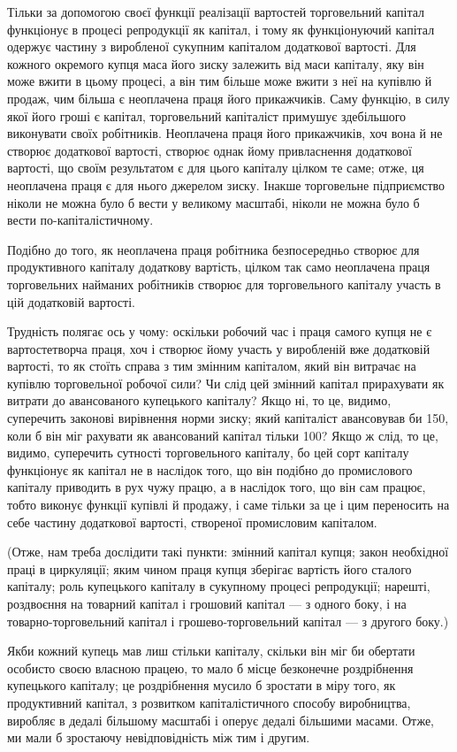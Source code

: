 Тільки за допомогою своєї функції реалізації вартостей торговельний
капітал функціонує в процесі репродукції як капітал,
і тому як функціонуючий капітал одержує частину з виробленої
сукупним капіталом додаткової вартості. Для кожного окремого
купця маса його зиску залежить від маси капіталу, яку він
може вжити в цьому процесі, а він тим більше може вжити
з неї на купівлю й продаж, чим більша є неоплачена праця його
прикажчиків. Саму функцію, в силу якої його гроші є капітал,
торговельний капіталіст примушує здебільшого виконувати своїх
робітників. Неоплачена праця його прикажчиків, хоч вона й не
створює додаткової вартості, створює однак йому привласнення
додаткової вартості, що своїм результатом є для цього капіталу
цілком те саме; отже, ця неоплачена праця є для нього
джерелом зиску. Інакше торговельне підприємство ніколи не
можна було б вести у великому масштабі, ніколи не можна
було б вести по-капіталістичному.

Подібно до того, як неоплачена праця робітника безпосередньо
створює для продуктивного капіталу додаткову вартість, цілком
так само неоплачена праця торговельних найманих робітників створює
для торговельного капіталу участь в цій додатковій вартості.

Трудність полягає ось у чому: оскільки робочий час і праця
самого купця не є вартостетворча праця, хоч і створює йому
участь у виробленій вже додатковій вартості, то як стоїть справа
з тим змінним капіталом, який він витрачає на купівлю торговельної
робочої сили? Чи слід цей змінний капітал прирахувати
як витрати до авансованого купецького капіталу? Якщо ні, то це,
видимо, суперечить законові вирівнення норми зиску; який капіталіст
авансовував би 150, коли б він міг рахувати як авансований
капітал тільки 100? Якщо ж слід, то це, видимо, суперечить
сутності торговельного капіталу, бо цей сорт капіталу
функціонує як капітал не в наслідок того, що він подібно до
промислового капіталу приводить в рух чужу працю, а в наслідок
того, що він сам працює, тобто виконує функції купівлі й продажу,
і саме тільки за це і цим переносить на себе частину
додаткової вартості, створеної промисловим капіталом.

(Отже, нам треба дослідити такі пункти: змінний капітал купця;
закон необхідної праці в циркуляції; яким чином праця купця
зберігає вартість його сталого капіталу; роль купецького капіталу
в сукупному процесі репродукції; нарешті, роздвоєння на
товарний капітал і грошовий капітал — з одного боку, і на товарно-торговельний
капітал і грошево-торговельний капітал —
з другого боку.)

Якби кожний купець мав лиш стільки капіталу, скільки він
міг би обертати особисто своєю власною працею, то мало б
місце безконечне роздрібнення купецького капіталу; це роздрібнення
мусило б зростати в міру того, як продуктивний капітал,
з розвитком капіталістичного способу виробництва, виробляє
в дедалі більшому масштабі і оперує дедалі більшими масами.
Отже, ми мали б зростаючу невідповідність між тим і другим.
\parbreak{}  %

